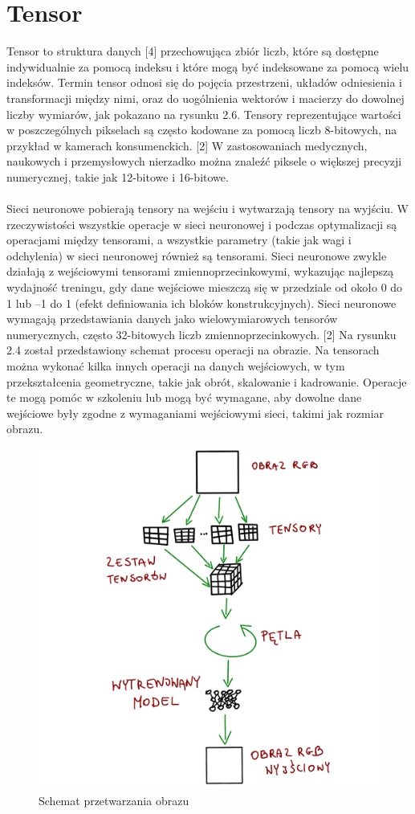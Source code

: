\documentclass[openright]{xmgr}
\begin{document}
\section{Tensor\label{s:dsssl}}


\indent \indent Tensor to struktura danych [4] przechowująca zbiór liczb, które są dostępne indywidualnie za pomocą indeksu i które mogą być indeksowane za pomocą wielu indeksów. Termin tensor odnosi się do pojęcia przestrzeni, układów odniesienia i transformacji między nimi, oraz do uogólnienia wektorów i macierzy do dowolnej liczby wymiarów, jak pokazano na rysunku 2.6.
Tensory reprezentujące wartości w poszczególnych pikselach są często kodowane za pomocą liczb 8-bitowych, na przykład w kamerach konsumenckich. [2] W zastosowaniach medycznych, naukowych i przemysłowych nierzadko można znaleźć piksele o większej precyzji numerycznej, takie jak 12-bitowe i 16-bitowe.
\\ 
\\
\indent \indent Sieci neuronowe pobierają tensory na wejściu i wytwarzają tensory na wyjściu. W rzeczywistości wszystkie operacje w sieci neuronowej i podczas optymalizacji są operacjami między tensorami, a wszystkie parametry (takie jak wagi i odchylenia) w sieci neuronowej również są tensorami. Sieci neuronowe zwykle działają z wejściowymi tensorami zmiennoprzecinkowymi, wykazując najlepszą wydajność treningu, gdy dane wejściowe mieszczą się w przedziale od około 0 do 1 lub –1 do 1 (efekt definiowania ich bloków konstrukcyjnych). Sieci neuronowe wymagają przedstawiania danych jako wielowymiarowych tensorów numerycznych, często 32-bitowych liczb zmiennoprzecinkowych. [2] Na rysunku 2.4 został przedstawiony schemat procesu operacji na obrazie. Na tensorach można  wykonać kilka innych operacji na danych wejściowych, w tym przekształcenia geometryczne, takie jak obrót, skalowanie i kadrowanie. Operacje te mogą pomóc w szkoleniu lub mogą być wymagane, aby dowolne dane wejściowe były zgodne z wymaganiami wejściowymi sieci, takimi jak rozmiar obrazu.

 \begin{figure}[!tbh]
\centering
\includegraphics[width=.8\hsize]{fig/5}
\caption{Schemat przetwarzania obrazu\label{RYS.5}}
\end{figure}
\end{document}
